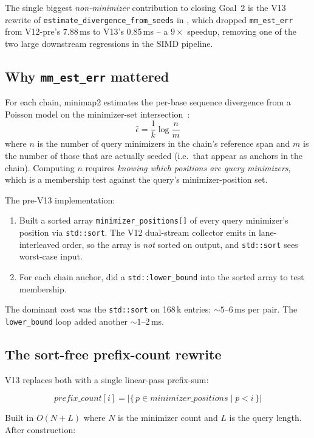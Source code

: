 The single biggest \emph{non-minimizer} contribution to closing
Goal~2 is the V13 rewrite of
\texttt{estimate\_divergence\_from\_seeds} in
, which dropped
\texttt{mm\_est\_err} from V12-pre's 7.88\,ms to V13's 0.85\,ms --
a $9\times$ speedup, removing one of the two large downstream
regressions in the SIMD pipeline.

\subsection{Why \texttt{mm\_est\_err} mattered}

For each chain, minimap2 estimates the per-base sequence divergence
from a Poisson model on the minimizer-set
intersection~\cite{minimap2_paper}:
\[
\hat{\epsilon} = \frac{1}{k} \log \frac{n}{m}
\]
where $n$ is the number of query minimizers in the chain's reference
span and $m$ is the number of those that are actually seeded
(i.e.\ that appear as anchors in the chain).  Computing $n$ requires
\emph{knowing which positions are query minimizers}, which is a
membership test against the query's minimizer-position set.

The pre-V13 implementation:

\begin{enumerate}
\item Built a sorted array \texttt{minimizer\_positions[]} of every
  query minimizer's position via \texttt{std::sort}.  The V12
  dual-stream collector emits in lane-interleaved order, so the
  array is \emph{not} sorted on output, and \texttt{std::sort}
  sees worst-case input.
\item For each chain anchor, did a \texttt{std::lower\_bound} into
  the sorted array to test membership.
\end{enumerate}

The dominant cost was the \texttt{std::sort} on 168\,k entries:
$\sim 5$--$6$\,ms per pair.  The \texttt{lower\_bound} loop added
another $\sim 1$--$2$\,ms.

\subsection{The sort-free prefix-count rewrite}

V13 replaces both with a single linear-pass prefix-sum:

\[
\textit{prefix\_count}[i] = \big|\{ \, p \in \textit{minimizer\_positions} \mid p < i \,\}\big|
\]

Built in $O(N + L)$ where $N$ is the minimizer count and $L$ is the
query length.  After construction:

